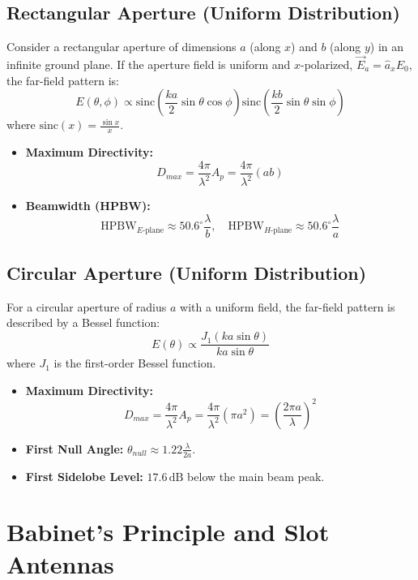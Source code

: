 \documentclass[12pt,a4paper]{article}
\begin{document}
\subsection{Rectangular Aperture (Uniform Distribution)}
Consider a rectangular aperture of dimensions $a$ (along $x$) and $b$ (along $y$) in an infinite ground plane. If the aperture field is uniform and $x$-polarized, $\vec{E}_a = \hat{a}_x E_0$, the far-field pattern is:
\[
E(\theta, \phi) \propto \text{sinc}\left( \frac{ka}{2} \sin\theta \cos\phi \right) \text{sinc}\left( \frac{kb}{2} \sin\theta \sin\phi \right)
\]
where $\text{sinc}(x) = \frac{\sin x}{x}$.
\begin{itemize}[leftmargin=*, itemsep=3pt]
  \item \textbf{Maximum Directivity:}
  \[
  D_{max} = \frac{4\pi}{\lambda^2} A_p = \frac{4\pi}{\lambda^2} (ab)
  \]
  \item \textbf{Beamwidth (HPBW):}
  \[
  \text{HPBW}_{E\text{-plane}} \approx 50.6^\circ \frac{\lambda}{b}, \quad \text{HPBW}_{H\text{-plane}} \approx 50.6^\circ \frac{\lambda}{a}
  \]
\end{itemize}

\subsection{Circular Aperture (Uniform Distribution)}
For a circular aperture of radius $a$ with a uniform field, the far-field pattern is described by a Bessel function:
\[
E(\theta) \propto \frac{J_1(ka \sin\theta)}{ka \sin\theta}
\]
where $J_1$ is the first-order Bessel function.
\begin{itemize}[leftmargin=*, itemsep=3pt]
  \item \textbf{Maximum Directivity:}
  \[
  D_{max} = \frac{4\pi}{\lambda^2} A_p = \frac{4\pi}{\lambda^2} (\pi a^2) = \left( \frac{2\pi a}{\lambda} \right)^{\!2}
  \]
  \item \textbf{First Null Angle:} $\theta_{null} \approx 1.22 \frac{\lambda}{2a}$.
  \item \textbf{First Sidelobe Level:} $17.6\,\text{dB}$ below the main beam peak.
\end{itemize}

\section{Babinet's Principle and Slot Antennas}
\end{document}

